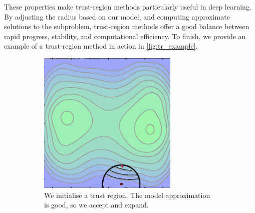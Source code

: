 These properties make trust-region methods particularly useful in deep learning. By adjusting the radius based on our model, and computing approximate solutions to the subproblem, trust-region methods offer a good balance between rapid progress, stability, and computational efficiency. To finish, we provide an example of a trust-region method in action in \cref{fig:tr_example}.

\begin{figure}[H]
    \begin{subfigure}[b]{0.32\linewidth}
        \centering
        \includegraphics[width=\linewidth]{figures/2background/tr1.png}
        \caption{We initialise a trust region. The model approximation is good, so we accept and expand.}
        \label{fig:tr_example_1}
    \end{subfigure}
    \hfill
    \begin{subfigure}[b]{0.32\linewidth}
        \centering

\end{subfigure}
\end{figure}

